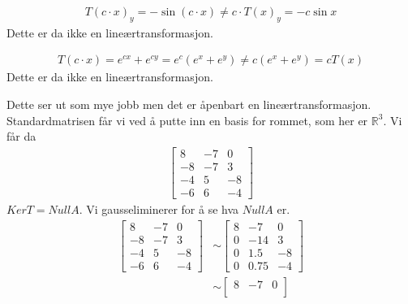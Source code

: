\documentclass[11pt, a4paper, norsk]{NTNUoving}
\begin{document}
\begin{oppgave}[1]
    \begin{punkt}
        \begin{align*}
            T(c\cdot x)_y = -\sin (c\cdot x) \neq c\cdot T(x)_y = -c\sin x
        \end{align*}
        Dette er da ikke en lineærtransformasjon.
    \end{punkt}
    \begin{punkt}
        \begin{align*}
            T(c\cdot x) = e^{cx}+e^{cy}=e^c(e^x+e^y)\neq c(e^x+e^y)=cT(x)
        \end{align*}
        Dette er da ikke en lineærtransformasjon.
    \end{punkt}
    \begin{punkt}
        Dette ser ut som mye jobb men det er åpenbart en lineærtransformasjon. 
        Standardmatrisen får vi ved å putte inn en basis for rommet, som her er $\mathbb{R}^3$. Vi får da
        \begin{align}
            \begin{bmatrix}
                8 & -7 & 0 \\
                -8 & -7 & 3\\
                -4 & 5 & -8\\
                -6 & 6 & -4
            \end{bmatrix}
        \end{align}
        $KerT=NullA$. Vi gausseliminerer for å se hva $NullA$ er.
        \begin{align}
            \begin{bmatrix}
                8 & -7 & 0 \\
                -8 & -7 & 3\\
                -4 & 5 & -8\\
                -6 & 6 & -4
            \end{bmatrix}
            &\sim
            \begin{bmatrix}
                8 & -7 & 0 \\
                0 & -14 & 3\\
                0 & 1.5 & -8\\
                0 & 0.75 & -4
            \end{bmatrix}
            \\&\sim
            \begin{bmatrix}
                8 & -7 & 0 \\

\end{bmatrix}
\end{align}
\end{punkt}
\end{oppgave}
\end{document}
